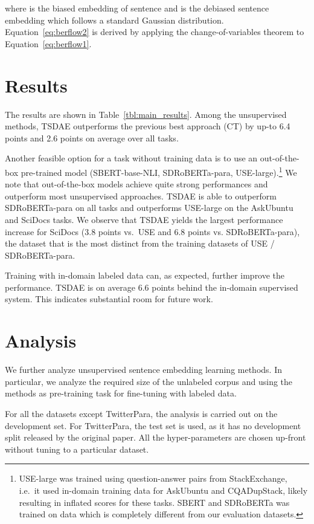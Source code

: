 \documentclass[11pt,a4paper]{article}
\begin{document}
where  is the biased embedding of sentence  and  is the debiased sentence embedding which follows a standard Gaussian distribution. Equation~\ref{eq:berflow2} is derived by applying the change-of-variables theorem to Equation~\ref{eq:berflow1}.


\section{Results}
\label{sec:results}
The results are shown in Table~\ref{tbl:main_results}. Among the unsupervised methods, TSDAE outperforms the previous best approach (CT) by up-to 6.4 points and 2.6 points on average over all tasks.

Another feasible option for a task without training data is to use an out-of-the-box pre-trained model (SBERT-base-NLI, SDRoBERTa-para, USE-large).\footnote{USE-large was trained using question-answer pairs from StackExchange, i.e.\ it used in-domain training data for AskUbuntu and CQADupStack, likely resulting in inflated scores for these tasks. SBERT and SDRoBERTa was trained on data which is completely different from our evaluation datasets.} We note that out-of-the-box models achieve quite strong performances and outperform most unsupervised approaches. TSDAE is able to outperform SDRoBERTa-para on all tasks and outperforms USE-large on the AskUbuntu and SciDocs tasks. We observe that TSDAE yields the largest performance increase for SciDocs (3.8 points vs.\ USE and 6.8 points vs. SDRoBERTa-para), the dataset that is the most distinct from the training datasets of USE / SDRoBERTa-para. 


Training with in-domain labeled data can, as expected, further improve the performance. TSDAE is on average 6.6 points behind the in-domain supervised system. This indicates substantial room for future work. 


\section{Analysis}
\label{sec:analysis}
We further analyze unsupervised sentence embedding learning methods. In particular, we analyze the required size of the unlabeled corpus and using the methods as pre-training task for fine-tuning with labeled data. 

For all the datasets except TwitterPara, the analysis is carried out on the development set. For TwitterPara, the test set is used, as it has no development split released by the original paper. All the hyper-parameters are chosen up-front without tuning to a particular dataset.
\end{document}
